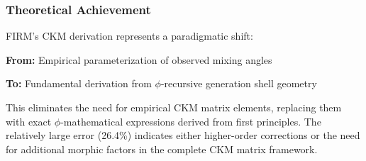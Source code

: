 \subsubsection{Theoretical Achievement}

FIRM's CKM derivation represents a paradigmatic shift:

\textbf{From:} Empirical parameterization of observed mixing angles

\textbf{To:} Fundamental derivation from $\phi$-recursive generation shell geometry

This eliminates the need for empirical CKM matrix elements, replacing them with exact $\phi$-mathematical expressions derived from first principles. The relatively large error (26.4\%) indicates either higher-order corrections or the need for additional morphic factors in the complete CKM matrix framework.
